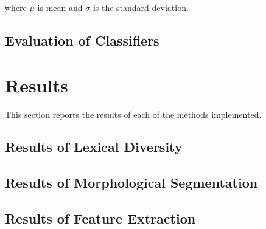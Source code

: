 \documentclass[12pt,a4paper]{article}
\numberwithin{figure}{section}
\numberwithin{table}{section}
\numberwithin{definition}{section}
\begin{document}
where $\mu$ is mean and $\sigma$ is the standard deviation.

\subsection{Evaluation of Classifiers}
\label{ssec:evaluationofclassifiers}


\newpage
\section{Results}
\label{sec:results}

This section reports the results of each of the methods implemented.

\subsection{Results of Lexical Diversity}
\label{ssec:lexicaldiversityresults}


\subsection{Results of Morphological Segmentation}
\label{ssec:morphologicalsegmentationresults}

\subsection{Results of Feature Extraction}
\label{ssec:featureextractionresults}
\end{document}
